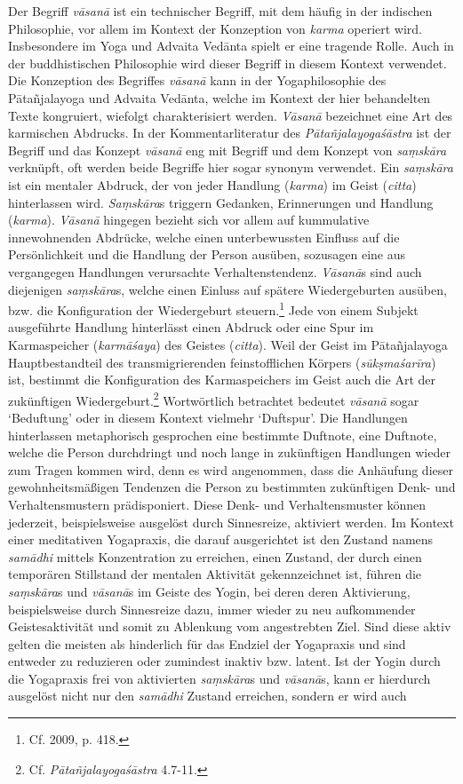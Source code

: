 Der Begriff \textit{vāsanā} ist ein technischer Begriff, mit dem häufig in der indischen Philosophie, vor allem im Kontext der Konzeption von \textit{karma} operiert wird. Insbesondere im Yoga und Advaita Vedānta spielt er eine tragende Rolle. Auch in der buddhistischen Philosophie wird dieser Begriff in diesem Kontext verwendet. Die Konzeption des Begriffes \textit{vāsanā} kann in der Yogaphilosophie des Pātañjalayoga und Advaita Vedānta, welche im Kontext der hier behandelten Texte kongruiert, wiefolgt charakterisiert werden. \textit{Vāsanā} bezeichnet eine Art des karmischen Abdrucks. In der Kommentarliteratur des \textit{Pātañjalayogaśāstra} ist der Begriff und das Konzept \textit{vāsanā} eng mit Begriff und dem Konzept von \textit{saṃskāra} verknüpft, oft werden beide Begriffe hier sogar synonym verwendet. Ein \textit{saṃskāra} ist ein mentaler Abdruck, der von jeder Handlung (\textit{karma}) im Geist (\textit{citta}) hinterlassen wird. \textit{Saṃskāra}s triggern Gedanken, Erinnerungen und Handlung (\textit{karma}). \textit{Vāsanā} hingegen bezieht sich vor allem auf kummulative innewohnenden Abdrücke, welche einen unterbewussten Einfluss auf die Persönlichkeit und die Handlung der Person ausüben, sozusagen eine aus vergangegen Handlungen verursachte Verhaltenstendenz. \textit{Vāsanā}s sind auch diejenigen \textit{saṃskāra}s, welche einen Einluss auf spätere Wiedergeburten ausüben, bzw. die Konfiguration der Wiedergeburt steuern.\footnote{Cf. \citeauthor{bryant2009} 2009, p. 418.} Jede von einem Subjekt ausgeführte Handlung hinterlässt einen Abdruck oder eine Spur im Karmaspeicher (\textit{karmāśaya}) des Geistes (\textit{citta}). Weil der Geist im Pātañjalayoga Hauptbestandteil des transmigrierenden feinstofflichen Körpers (\textit{sūkṣmaśarīra}) ist, bestimmt die Konfiguration des Karmaspeichers im Geist auch die Art der zukünftigen Wiedergeburt.\footnote{Cf. \textit{Pātañjalayogaśāstra} 4.7-11.} Wortwörtlich betrachtet bedeutet \textit{vāsanā} sogar `Beduftung' oder in diesem Kontext vielmehr `Duftspur'. Die Handlungen hinterlassen metaphorisch gesprochen eine bestimmte Duftnote, eine Duftnote, welche die Person durchdringt und noch lange in zukünftigen Handlungen wieder zum Tragen kommen wird, denn es wird angenommen, dass die Anhäufung dieser gewohnheitsmäßigen Tendenzen die Person zu bestimmten zukünftigen Denk- und Verhaltensmustern prädisponiert. Diese Denk- und Verhaltensmuster können jederzeit, beispielsweise ausgelöst durch Sinnesreize, aktiviert werden. Im Kontext einer meditativen Yogapraxis, die darauf ausgerichtet ist den Zustand namens \textit{samādhi} mittels Konzentration zu erreichen, einen Zustand, der durch einen temporären Stillstand der mentalen Aktivität gekennzeichnet ist, führen die \textit{saṃskāra}s und \textit{vāsanā}s im Geiste des Yogin, bei deren deren Aktivierung, beispielsweise durch Sinnesreize dazu, immer wieder zu neu aufkommender Geistesaktivität und somit zu Ablenkung vom angestrebten Ziel. Sind diese aktiv gelten die meisten als hinderlich für das Endziel der Yogapraxis und sind entweder zu reduzieren oder zumindest inaktiv bzw. latent. Ist der Yogin durch die Yogapraxis frei von aktivierten \textit{saṃskāra}s und \textit{vāsanā}s, kann er hierdurch ausgelöst nicht nur den \textit{samādhi} Zustand erreichen, sondern er wird auch 